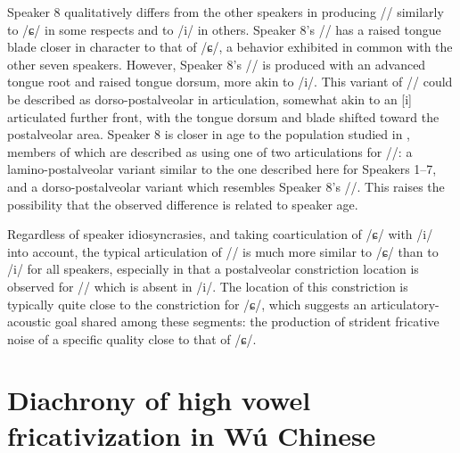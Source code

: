 \documentclass[output=paper,hidelinks]{langscibook}
\begin{document}
Speaker 8 qualitatively differs from the other speakers in producing /\iz/ similarly to /ɕ/ in some respects and to /i/ in others.
%
Speaker 8's /\iz{}/ has a raised tongue blade closer in character to that of /ɕ/,  a behavior exhibited in common with the other seven speakers.
%
However, Speaker 8's /\iz{}/ is produced with an advanced tongue root and raised tongue dorsum, more akin to /i/.
%
This variant of /\iz{}/ could be described as dorso-postalveolar in articulation,  somewhat akin to an [i] articulated further front, with the tongue dorsum and blade shifted toward the postalveolar area.
%
Speaker 8 is closer in age to the population studied in \citet{ling-phd}, members of which are described as using one of two articulations for /\iz{}/: a lamino-postalveolar variant similar to the one described here for Speakers 1--7, and a dorso-postalveolar variant which resembles Speaker 8's /\iz{}/.
%
This raises the possibility that the observed difference is related to speaker age.

Regardless of speaker idiosyncrasies, and taking coarticulation of /ɕ/ with /i/ into account, the typical articulation of /\iz{}/ is much more similar to /ɕ/ than to /i/ for all speakers, especially in that a postalveolar constriction location is observed for /\iz{}/ which is absent in /i/.
%
The location of this constriction is typically quite close to the constriction for /ɕ/, which suggests an articulatory-acoustic goal shared among these segments: the production of strident fricative noise of a specific quality close to that of /ɕ/.
%


\section{Diachrony of high vowel fricativization in Wú Chinese}\label{sec:faytak:3}
\end{document}
